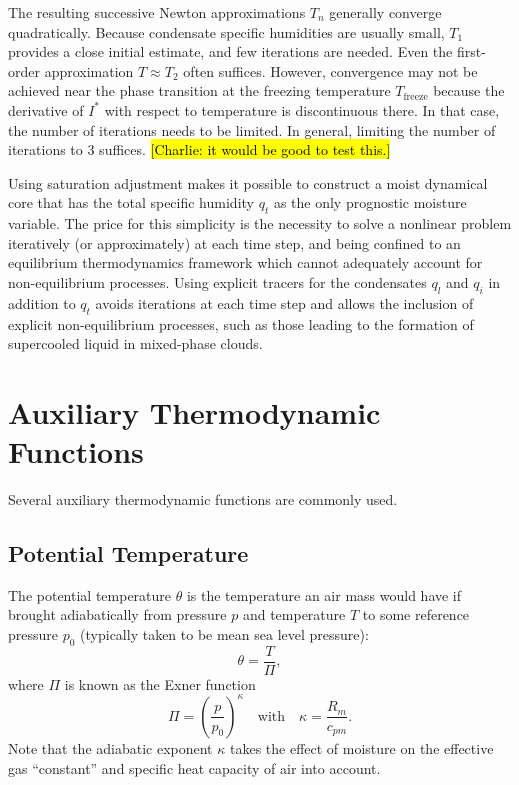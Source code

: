 \documentclass{report}
\begin{document}
The resulting successive Newton approximations $T_n$ generally converge quadratically. Because condensate specific humidities are usually small, $T_1$ provides a close initial estimate, and few iterations are needed. Even the first-order approximation $T\approx T_2$ often suffices. However, convergence may not be achieved near the phase transition at the freezing temperature $T_{\mathrm{freeze}}$ because the derivative of $I^*$ with respect to temperature is discontinuous there. In that case, the number of iterations needs to be limited. In general, limiting the number of iterations to 3 suffices. \hl{[Charlie: it would be good to test this.]}

Using saturation adjustment makes it possible to construct a moist dynamical core that has the total specific humidity $q_t$ as the only prognostic moisture variable. The price for this simplicity is the necessity to solve a nonlinear problem iteratively (or approximately) at each time step, and being confined to an equilibrium thermodynamics framework which cannot adequately account for non-equilibrium processes. Using explicit tracers for the condensates $q_l$ and $q_i$ in addition to $q_t$ avoids iterations at each time step and allows the inclusion of explicit non-equilibrium processes, such as those leading to the formation of supercooled liquid in mixed-phase clouds. 

\section{Auxiliary Thermodynamic Functions}

Several auxiliary thermodynamic functions are commonly used. 

\subsection{Potential Temperature} The potential temperature $\theta$ is the temperature an air mass would have if brought adiabatically from pressure $p$ and temperature $T$ to some reference pressure $p_0$ (typically taken to be mean sea level pressure):
\begin{equation}\label{e:pot_temp_press_T}
\theta = \frac{T}{\Pi},  
\end{equation}
where $\Pi$ is known as the Exner function
\begin{equation}
    \Pi  = \left( \frac{p}{p_0} \right)^\kappa \quad \text{with} \quad \kappa = \frac{R_m}{c_{pm}}.
\end{equation}
Note that the adiabatic exponent $\kappa$ takes the effect of  moisture on the effective gas ``constant'' and specific heat capacity of air into account.
\end{document}
